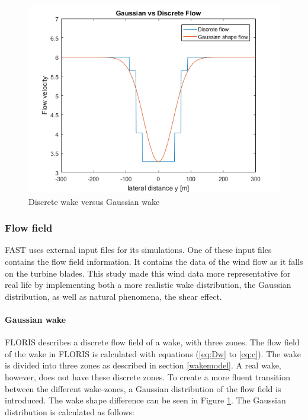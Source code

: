 \begin{figure}
  \includegraphics[width=\linewidth]{./Figures/PlotGausDiscWakeDWake180U6yaw0.png} %
  \caption{Discrete wake versus Gaussian wake} %
  \label{fig:disgaus}
\end{figure}


\subsubsection{Flow field}
FAST uses external input files for its simulations. One of these input files contains the flow field information. It contains the data of the wind flow as it falls on the turbine blades. This study made this wind data more representative for real life by implementing both a more realistic wake distribution, the Gaussian distribution, as well as natural phenomena, the shear effect.

\paragraph{Gaussian wake}
FLORIS describes a discrete flow field of a wake, with three zones. The flow field of the wake in FLORIS is calculated with equations (\ref{eq:Dw} to \ref{eq:c}). The wake is divided into three zones as described in section \ref{wakemodel}. A real wake, however, does not have these discrete zones. To create a more fluent transition between the different wake-zones, a Gaussian distribution of the flow field is introduced\cite{Bastankhah2016}. The wake shape difference can be seen in Figure \ref{fig:disgaus}.  The Gaussian distribution is calculated as follows: 

